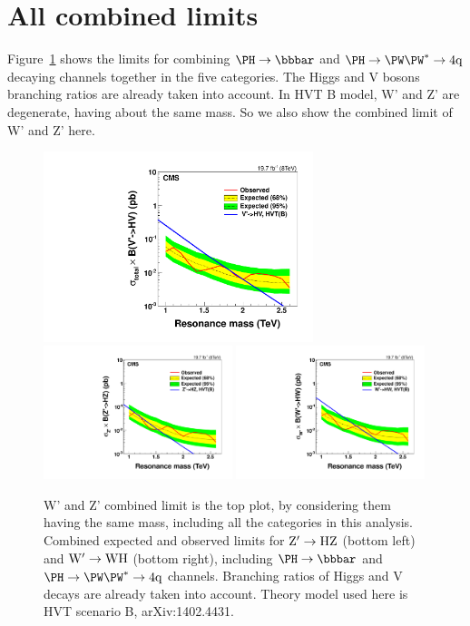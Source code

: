
\section{All combined limits}
\label{results}

Figure~\ref{fig:HVCombined} shows the limits for combining $\Hbb$ and $\Hww$ decaying channels together in 
the five categories. The Higgs and V bosons branching ratios are already taken into account.  
In HVT B model, W' and Z' are degenerate, having about the same mass. So we also show the combined limit of 
W' and Z' here.  


\begin{figure}[ht!pb]
\begin{center}
\includegraphics[width=0.7\textwidth]{EXO-14-009/brazilianFlag_HV.pdf}
\includegraphics[width=0.49\textwidth]{EXO-14-009/brazilianFlag_HZqq.pdf}
\includegraphics[width=0.49\textwidth]{EXO-14-009/brazilianFlag_HWqq.pdf}
\end{center}
\caption{W' and Z' combined limit is the top plot, by considering them having the same mass, including all the categories in this analysis.   
Combined expected and observed limits for ${\rm Z'\to HZ}$ (bottom left) and ${\rm W' \to WH}$ (bottom right),  including $\Hbb$ and $\Hww$ channels. Branching ratios of Higgs and V decays 
are already taken into account. Theory model used here is HVT scenario B, arXiv:1402.4431.  
}
\label{fig:HVCombined}
\end{figure}

